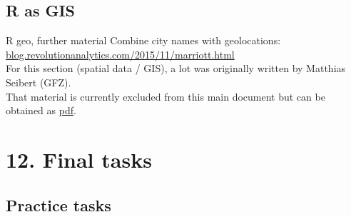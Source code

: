 \documentclass[xcolor=table,           xcolor=dvipsnames]{beamer}\usepackage[]{graphicx}\usepackage[]{color}
\begin{document}
\subsection{R as GIS}

\begin{frame}[fragile]{R geo, further material}
Combine city names with geolocations:\\ \href{http://blog.revolutionanalytics.com/2015/11/marriott.html}{blog.revolutionanalytics.com/2015/11/marriott.html}\\[1em]
For this section (spatial data / GIS), a lot was originally written by Matthias Seibert (GFZ). \\
That material is currently excluded from this main document but can be obtained as \href{https://dl.dropboxusercontent.com/u/4836866/R_course_Berry/RcourseBerry_Mathias.pdf}{pdf}.
\end{frame}

\section{12. Final tasks}

\subsection{Practice tasks}
\end{document}

